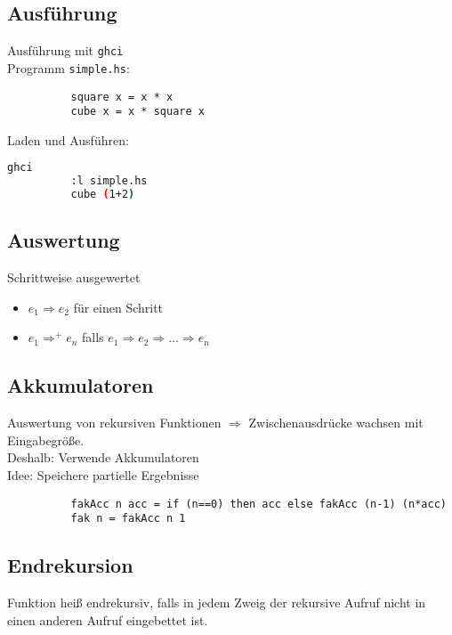 \documentclass[10pt,a4paper,draft]{article}
\def\code#1{\texttt{#1}}
\begin{document}
        \subsection{Ausführung}
        Ausführung mit \code{ghci}\\
        Programm \code{simple.hs}:
        \begin{lstlisting}
          square x = x * x
          cube x = x * square x
        \end{lstlisting}
        Laden und Ausführen:
        \begin{lstlisting}[language=bash]
          ghci
          :l simple.hs
          cube (1+2)
        \end{lstlisting}

        \subsection{Auswertung}
        Schrittweise ausgewertet
        \begin{itemize}
          \item \(e_1 \Rightarrow e_2\) für einen Schritt
          \item \(e_1 \Rightarrow^+ e_n \) falls \(e_1 \Rightarrow e_2 \Rightarrow ... \Rightarrow e_n\)
        \end{itemize}
        
        \subsection{Akkumulatoren}
        Auswertung von rekursiven Funktionen \(\Rightarrow\) Zwischenausdrücke wachsen mit Eingabegröße.\\
        Deshalb: Verwende Akkumulatoren\\
        Idee: Speichere partielle Ergebnisse
        \begin{lstlisting}
          fakAcc n acc = if (n==0) then acc else fakAcc (n-1) (n*acc)
          fak n = fakAcc n 1
        \end{lstlisting}

        \subsection{Endrekursion}
        Funktion heiß endrekursiv, falls in jedem Zweig der rekursive Aufruf nicht in einen anderen Aufruf eingebettet ist.
\end{document}
